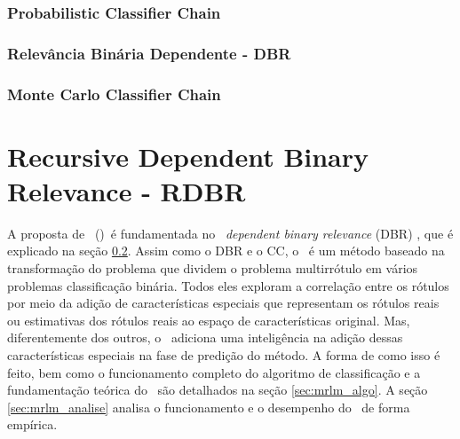 \subsection{Probabilistic Classifier Chain}
\subsection{Relevância Binária Dependente - DBR}
\label{sec:dbr}
\subsection{Monte Carlo Classifier Chain}
\cite{mcc2012}



\chapter{Recursive Dependent Binary Relevance - RDBR}
A proposta de \MRLM~(\MRLMa)~é fundamentada no \MML~\textit{dependent binary relevance} (DBR) \cite{dbr2014}, que é explicado
na seção \ref{sec:dbr}. Assim como o DBR e o CC, o \MRLMa~é um método baseado na transformação do problema que dividem o problema
multirrótulo em vários problemas classificação binária. Todos eles exploram a correlação entre os rótulos por meio da adição de
características especiais que representam os rótulos reais ou estimativas dos rótulos reais ao espaço de características original. 
Mas, diferentemente dos outros, o \MRLMa~adiciona uma inteligência na adição dessas características especiais na fase de predição do método.
A forma de como isso é feito, bem como o funcionamento completo do algoritmo de classificação e a fundamentação teórica
do \MRLMa~são detalhados na seção \ref{sec:mrlm_algo}. 
A seção \ref{sec:mrlm_analise} analisa o funcionamento e o desempenho do \MRLMa~de forma empírica.


